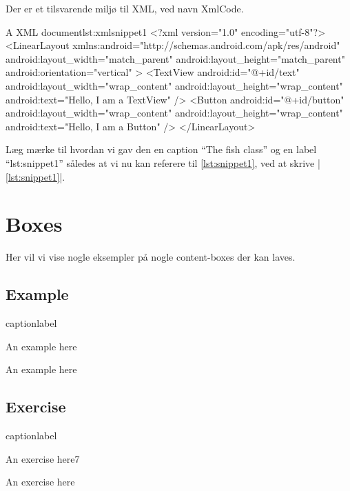 Der er et tilsvarende miljø til XML, ved navn XmlCode.
\begin{XmlCode}{A XML document}{lst:xmlsnippet1}
	<?xml version="1.0" encoding="utf-8"?>
	<LinearLayout 
		xmlns:android="http://schemas.android.com/apk/res/android"
		android:layout_width="match_parent"
		android:layout_height="match_parent"
		android:orientation="vertical" >
		<TextView android:id="@+id/text"
			android:layout_width="wrap_content"
			android:layout_height="wrap_content"
			android:text="Hello, I am a TextView" />
		<Button android:id="@+id/button"
			android:layout_width="wrap_content"
			android:layout_height="wrap_content"
			android:text="Hello, I am a Button" />
	</LinearLayout>
\end{XmlCode}

Læg mærke til hvordan vi gav den en caption ``The fish class'' og en label 
``lst:snippet1'' således at vi nu kan referere til \autoref{lst:snippet1}, ved 
at skrive \LaTeXInline|\autoref{lst:snippet1}|.

\vspace{5mm}

\section{Boxes}

Her vil vi vise nogle eksempler på nogle content-boxes der kan laves.
\begin{samepage}
	\subsection{Example}
	\begin{LaTeXCode}{caption}{label}
	\begin{example}
		An example here
	\end{example}
	\end{LaTeXCode}
	\begin{example}
		An example here
	\end{example}
\end{samepage}

\subsection{Exercise}
\begin{LaTeXCode}{caption}{label}
\begin{exercise}
	An exercise here7
\end{exercise}
\end{LaTeXCode}
\begin{exercise}
	An exercise here
\end{exercise}

